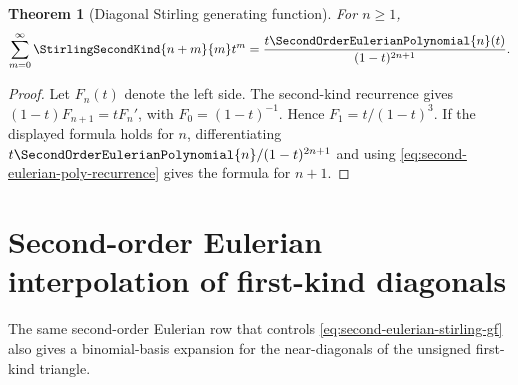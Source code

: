 \documentclass[11pt,a4paper,oneside,openany]{book}
\newtheorem{theorem}{Theorem}[chapter]
\theoremstyle{definition}
\theoremstyle{remark}
\begin{document}
\begin{theorem}[Diagonal Stirling generating function]\label{thm:second-eulerian-stirling-gf}
For $n\ge1$,
\begin{equation}\label{eq:second-eulerian-stirling-gf}
 \sum_{m=0}^{\infty}\StirlingSecondKind{n+m}{m}t^m
 =\frac{t\SecondOrderEulerianPolynomial{n}(t)}{(1-t)^{2n+1}}.
\end{equation}
\end{theorem}
\begin{proof}
Let $F_n(t)$ denote the left side.  The second-kind recurrence gives
$(1-t)F_{n+1}=tF_n'$, with $F_0=(1-t)^{-1}$.  Hence
$F_1=t/(1-t)^3$.  If the displayed formula holds for $n$, differentiating
$t\SecondOrderEulerianPolynomial{n}/(1-t)^{2n+1}$ and using
\eqref{eq:second-eulerian-poly-recurrence} gives the formula for $n+1$.
\end{proof}


\section{Second-order Eulerian interpolation of first-kind diagonals}
The same second-order Eulerian row that controls
\eqref{eq:second-eulerian-stirling-gf} also gives a binomial-basis expansion for
the near-diagonals of the unsigned first-kind triangle.
\end{document}
